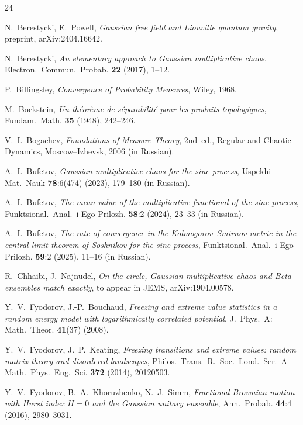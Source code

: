 \documentclass[12pt,a4paper]{article}
\theoremstyle{definition}
\theoremstyle{remark}
\begin{document}
	\begin{thebibliography}{24}
		
		N.~Berestycki, E.~Powell,
		\textit{Gaussian free field and Liouville quantum gravity},
		preprint, arXiv:2404.16642.
		
		N.~Berestycki,
		\textit{An elementary approach to Gaussian multiplicative chaos},
		Electron.~Commun.~Probab. \textbf{22} (2017), 1--12.
		
		P.~Billingsley,
		\textit{Convergence of Probability Measures},
		Wiley, 1968.
		
		M.~Bockstein,
		\textit{Un théorème de séparabilité pour les produits topologiques},
		Fundam.~Math. \textbf{35} (1948), 242--246.
		
		V.~I.~Bogachev,
		\textit{Foundations of Measure Theory}, 2nd~ed.,
		Regular and Chaotic Dynamics, Moscow--Izhevsk, 2006 (in Russian).
		
		A.~I.~Bufetov,
		\textit{Gaussian multiplicative chaos for the sine-process},
		Uspekhi Mat.~Nauk \textbf{78}:6(474) (2023), 179--180 (in Russian).
		
		A.~I.~Bufetov,
		\textit{The mean value of the multiplicative functional of the sine-process},
		Funktsional.~Anal.~i Ego Prilozh. \textbf{58}:2 (2024), 23--33 (in Russian).
		
		A.~I.~Bufetov,
		\textit{The rate of convergence in the Kolmogorov--Smirnov metric in the central limit theorem of Soshnikov for the sine-process},
		Funktsional.~Anal.~i Ego Prilozh. \textbf{59}:2 (2025), 11--16 (in Russian).
		
		R.~Chhaibi, J.~Najnudel,
		\textit{On the circle, Gaussian multiplicative chaos and Beta ensembles match exactly},
		to appear in JEMS, arXiv:1904.00578.
		
		Y.~V.~Fyodorov, J.-P.~Bouchaud,
		\textit{Freezing and extreme value statistics in a random energy model with logarithmically correlated potential},
		J.~Phys.~A: Math.~Theor. \textbf{41}(37) (2008).
		
		Y.~V.~Fyodorov, J.~P.~Keating,
		\textit{Freezing transitions and extreme values: random matrix theory and disordered landscapes},
		Philos.~Trans.~R.~Soc.~Lond.~Ser.~A Math.~Phys.~Eng.~Sci. \textbf{372} (2014), 20120503.
		
		Y.~V.~Fyodorov, B.~A.~Khoruzhenko, N.~J.~Simm,
		\textit{Fractional Brownian motion with Hurst index $H = 0$ and the Gaussian unitary ensemble},
		Ann.~Probab. \textbf{44}:4 (2016), 2980--3031.
		

\end{thebibliography}
\end{document}
